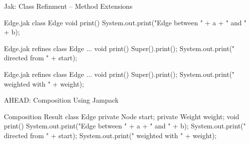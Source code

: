\begin{frame}[fragile]{Jak: Class Refinment – Method Extensions}
	\begin{mycolumns}[widths={50,50},animation=none]
	\mynextcolumn
{\tiny
\begin{codetight}{Edge.jak}
class Edge {
	void print() {
		System.out.print("Edge between " + a + " and " + b);
	}
}
\end{codetight}
\begin{codetight}{Edge.jak}
refines class Edge {
	...
	void print() {
		Super().print();
		System.out.print(" directed from " + start);
	}
}
\end{codetight}
\begin{codetight}{Edge.jak}
refines class Edge {
	...
	void print() {
		Super().print();
		System.out.print(" weighted with " + weight);
	}
}
\end{codetight}
}
	\end{mycolumns}
\end{frame}

\begin{frame}[fragile]{AHEAD: Composition Using Jampack}
	\begin{mycolumns}[widths={35,65},animation=none]
	\mynextcolumn
\begin{codetight}{Composition Result}
class Edge {
	private Node start;
	private Weight weight;
	void print() {
		System.out.print("Edge between " + a + " and " + b);
		System.out.print(" directed from " + start);
		System.out.print(" weighted with " + weight);
	}
}
\end{codetight}
	\end{mycolumns}
\end{frame}


